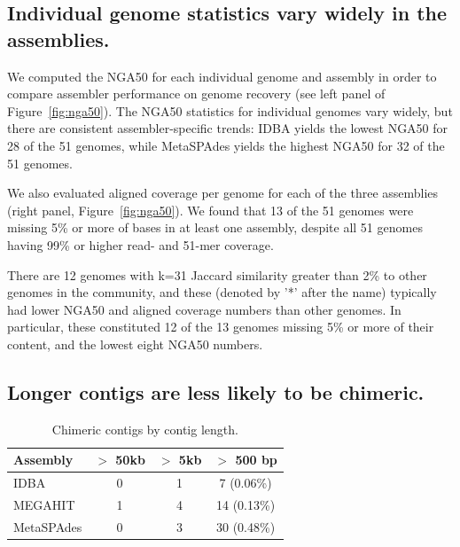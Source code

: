 \documentclass[11pt]{article}
\begin{document}
\subsection*{Individual genome statistics vary widely in the assemblies.}

We computed the NGA50 for each individual genome and assembly in order
to compare assembler performance on genome recovery (see left panel of
Figure~\ref{fig:nga50}).  The NGA50 statistics for individual genomes
vary widely, but there are consistent assembler-specific trends: IDBA
yields the lowest NGA50 for 28 of the 51 genomes, while MetaSPAdes yields
the highest NGA50 for 32 of the 51 genomes.

We also evaluated aligned coverage per genome for each of the three
assemblies (right panel, Figure~\ref{fig:nga50}).  We found that 13
of the 51 genomes were missing 5\% or more of bases in at least one
assembly, despite all 51 genomes having 99\% or higher read- and
51-mer coverage.

There are 12 genomes with k=31 Jaccard similarity greater than 2\% to
other genomes in the community, and these (denoted by '*' after the
name) typically had lower NGA50 and aligned coverage numbers than
other genomes.  In particular, these constituted 12 of the 13 genomes
missing 5\% or more of their content, and the lowest eight NGA50 numbers.

\subsection*{Longer contigs are less likely to be chimeric.}

\begin{table}[!h]
\centering
\caption{Chimeric contigs by contig length.}
\begin{tabular}{|l|c|c|c|}\hline
\textbf{Assembly} & \textbf {$>$ 50kb} & \textbf {$>$ 5kb} & \textbf{$>$ 500 bp}
\\ \hline

IDBA         & 0 & 1 & 7 (0.06\%) \\
MEGAHIT      & 1 & 4 & 14 (0.13\%) \\ 
MetaSPAdes       & 0 & 3 & 30 (0.48\%) \\
\hline

\end{tabular}
\label{table:contig-chimera}

\end{table}
\end{document}
